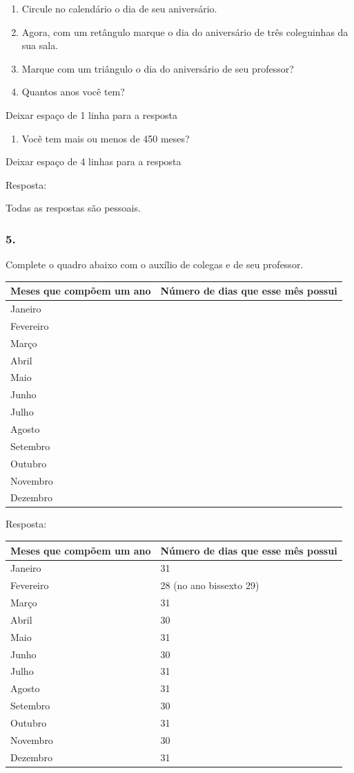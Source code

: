\begin{enumerate}
\def\labelenumi{\alph{enumi})}
\item
  Circule no calendário o dia de seu aniversário.
\item
  Agora, com um retângulo marque o dia do aniversário de três
  coleguinhas da sua sala.
\item
  Marque com um triângulo o dia do aniversário de seu professor?
\item
  Quantos anos você tem?
\end{enumerate}

Deixar espaço de 1 linha para a resposta

\begin{enumerate}
\def\labelenumi{\alph{enumi})}
\item
  Você tem mais ou menos de 450 meses?
\end{enumerate}

Deixar espaço de 4 linhas para a resposta

Resposta:

Todas as respostas são pessoais.

\subsubsection{5.}\label{section-68}

Complete o quadro abaixo com o auxílio de colegas e de seu professor.

\begin{longtable}[]{@{}ll@{}}
\toprule
Meses que compõem um ano & Número de dias que esse mês
possui\tabularnewline
\midrule
\endhead
Janeiro &\tabularnewline
Fevereiro &\tabularnewline
Março &\tabularnewline
Abril &\tabularnewline
Maio &\tabularnewline
Junho &\tabularnewline
Julho &\tabularnewline
Agosto &\tabularnewline
Setembro &\tabularnewline
Outubro &\tabularnewline
Novembro &\tabularnewline
Dezembro &\tabularnewline
\bottomrule
\end{longtable}

Resposta:

\begin{longtable}[]{@{}ll@{}}
\toprule
Meses que compõem um ano & Número de dias que esse mês
possui\tabularnewline
\midrule
\endhead
Janeiro & 31\tabularnewline
Fevereiro & 28 (no ano bissexto 29)\tabularnewline
Março & 31\tabularnewline
Abril & 30\tabularnewline
Maio & 31\tabularnewline
Junho & 30\tabularnewline
Julho & 31\tabularnewline
Agosto & 31\tabularnewline
Setembro & 30\tabularnewline
Outubro & 31\tabularnewline
Novembro & 30\tabularnewline
Dezembro & 31\tabularnewline
\bottomrule
\end{longtable}

